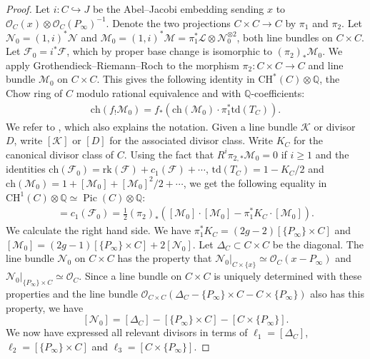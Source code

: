 \documentclass{article} %
\numberwithin{equation}{section}
\DeclareMathOperator{\Pic}{Pic}
\newcommand{\sh}[1]{\mathscr{#1}}
\renewcommand{\O}{\mathcal{O}}
\newcommand{\Q}{\mathbb{Q}}
\begin{document}
\begin{proof}
    Let $i\colon C\hookrightarrow J$ be the Abel--Jacobi embedding sending $x$ to $\O_C(x)\otimes \O_C(P_{\infty})^{-1}$.
    Denote the two projections $C\times C\rightarrow C$ by $\pi_1$ and $\pi_2$.
    Let $\sh{N}_0 = (1,i)^*\sh{N}$ and $\sh{M}_0 = (1,i)^*\sh{M} = \pi_1^*\sh{L} \otimes \sh{N}_0^{\otimes 2}$, both line bundles on $C\times C$.
    Let $\sh{F}_0 = i^*\sh{F}$, which by proper base change is isomorphic to $(\pi_2)_*\sh{M}_0$.
    We apply Grothendieck--Riemann--Roch to the morphism $\pi_2\colon C\times C\rightarrow C$ and line bundle $\sh{M}_0$ on $C\times C$.
    This gives the following identity in $\mathrm{CH}^*(C)\otimes \Q$, the Chow ring of $C$ modulo rational equivalence and with $\Q$-coefficients:
    \begin{align*}
        \mathrm{ch}(f_!\sh{M}_0) = f_*(\mathrm{ch}(\sh{M}_0) \cdot \pi_1^* \mathrm{td}(T_C)).
    \end{align*}
    We refer to \cite[Theorem A.5.3]{Harthshorne-AG}, which also explains the notation.
    Given a line bundle $\sh{K}$ or divisor $D$, write $[\sh{K}]$ or $[D]$ for the associated divisor class. Write $K_C$ for the canonical divisor class of $C$.
    Using the fact that $R^i \pi_{2,*}\sh{M}_0=0$ if $i\geq 1$ and the identities $\mathrm{ch}(\sh{F}_0) = \mathrm{rk}(\sh{F}) + c_1(\sh{F}) +\cdots$, $\mathrm{td}(T_C) = 1- K_C/2$ and $\mathrm{ch}(\sh{M}_0) = 1+ [\sh{M}_0] + [\sh{M}_0]^2/2 + \cdots$, we get the following equality in $\mathrm{CH}^1(C)\otimes \Q \simeq \Pic(C)\otimes \Q$:
    \begin{align*}
        [\det\sh{F}_0] = c_1(\sh{F}_0) = 
        \frac{1}{2}(\pi_2)_*([\sh{M}_0]\cdot [\sh{M}_0] - \pi_1^*K_C \cdot [\sh{M}_0]).
    \end{align*}
    We calculate the right hand side. 
    We have $\pi_1^*K_C= (2g-2) [\{P_{\infty}\} \times C]$
    and $[\sh{M}_0 ]  = (2g-1)[\{P_{\infty}\}\times C] + 2[\sh{N}_0]$.
    Let $\Delta_C\subset C\times C$ be the diagonal.
    The line bundle $\sh{N}_0$ on $C\times C$ has the property that $\sh{N}_0|_{C\times \{x\}}\simeq \O_C(x-P_{\infty})$ and $\sh{N}_0|_{\{P_{\infty}\}\times C}\simeq \O_C$. 
    Since a line bundle on $C\times C$ is uniquely determined with these properties and the line bundle $\O_{C\times C}(\Delta_C - \{P_{\infty}\}\times C- C\times\{P_{\infty}\})$ also has this property, we have 
    \[
    [\sh{N}_0] = [\Delta_C] - [\{P_{\infty}\}\times C]- [C\times\{P_{\infty}\}].
    \]
    We now have expressed all relevant divisors in terms of $\ell_1 = [\Delta_C]$, $\ell_2 = [\{P_{\infty}\}\times C]$ and $\ell_3 = [C\times \{P_{\infty}\}]$.

\end{proof}
\end{document}
